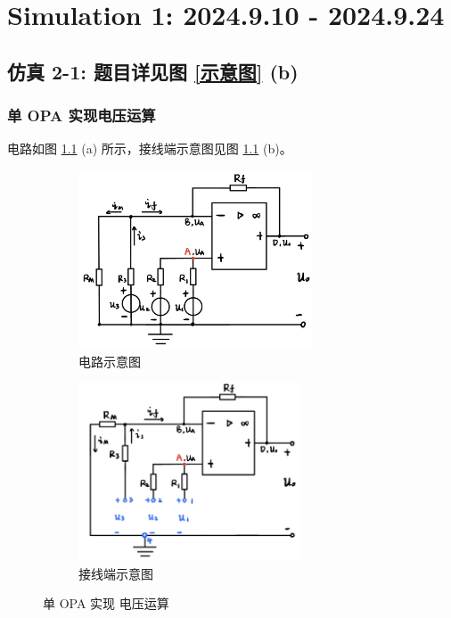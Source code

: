 \documentclass[UTF8]{report}
\theoremstyle{MyLineTheoremStyle} %
\theoremstyle{MyBlockTheoremStyle} %
\theoremstyle{MySubsubsectionStyle} %
\begin{document}






\chapter{Simulation 1: 2024.9.10 - 2024.9.24}
\thispagestyle{fancy}

\section{仿真 2-1: 题目详见图 \ref{示意图} (b)}

\subsection{单 OPA 实现电压运算}

电路如图 \ref{单 OPA 实现 电压运算} (a) 所示，接线端示意图见图 \ref{单 OPA 实现 电压运算} (b)。

\begin{figure}[H]\centering
\begin{subfigure}[t]{0.43\textwidth}\centering
    \includegraphics[height=150pt]{assets/3/单OPA.png}
    \caption{ 电路示意图 }
\end{subfigure}\begin{subfigure}[t]{0.43\textwidth}\centering
    \includegraphics[height=150pt]{assets/3/单OPA接线端.png}
    \caption{ 接线端示意图 }
\end{subfigure}
\caption{ 单 OPA 实现 电压运算 }\label{单 OPA 实现 电压运算}
\end{figure}
\end{document}
